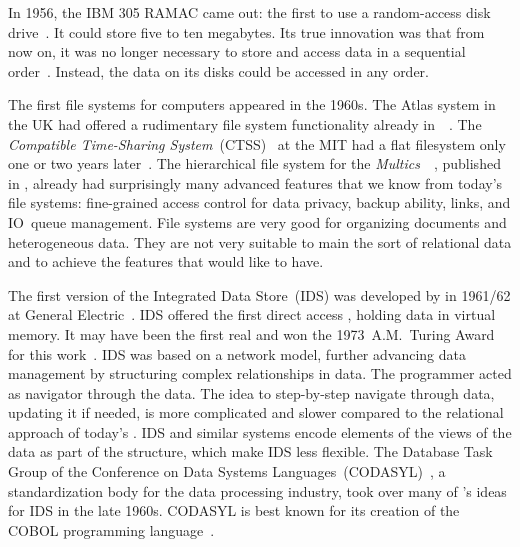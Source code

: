 In 1956, the IBM 305 RAMAC came out: the first to use a random-access disk drive~\cite{IRTFRADDRHBUCASTSFEFSFTE}.
It could store five to ten megabytes.
Its true innovation was that from now on, it was no longer necessary to store and access data in a sequential order~\cite{C20245YOQ}.
Instead, the data on its disks could be accessed in any order.

The first file systems for computers appeared in the 1960s.
The Atlas system in the UK had offered a rudimentary file system functionality already in~\citeyear{KPH1961TAS}~\cite{KPH1961TAS}.
The  \emph{Compatible Time-Sharing System}~(CTSS)~\cite{CMDDCHOK1963TCTSSAPG} at the MIT had a flat filesystem only one or two years later~\cite{OD1963TCCSLABTCDE}.
The hierarchical file system for the \emph{Multics}~~\cite{CV1965IAOOTMS}, published in \citeyear{DN1965AGPFSFSS}, already had surprisingly many advanced features that we know from today's file systems: fine-grained access control for data privacy, backup ability, links, and IO~queue management.
File systems are very good for organizing documents and heterogeneous data.
They are not very suitable to main the sort of relational data and to achieve the features that would like  to have.

The first version of the Integrated Data Store~(IDS) was developed by \citeauthor{B2009TOOTIDSITFDAD} in 1961/62 at General Electric~\cite{B2009TOOTIDSITFDAD,B1965SFRAP}.
IDS offered the first direct access , holding data in virtual memory.
It may have been the first real  and \citeauthor{B2009TOOTIDSITFDAD} won the 1973~A.M.~Turing Award for this work~\cite{H2016HCBITDAFOODW}.
IDS was based on a network model, further advancing data management by structuring complex relationships in data.
The programmer acted as navigator through the data.
The idea to step-by-step navigate through data, updating it if needed, is more complicated and slower compared to the relational approach of today's .
IDS and similar systems encode elements of the views of the data as part of the  structure, which make IDS less flexible.
The Database Task Group of the Conference on Data Systems Languages~(CODASYL)~\cite{TF1976CDBMS}, a standardization body for the data processing industry, took over many of \citeauthor{B2009TOOTIDSITFDAD}'s ideas for IDS in the late 1960s.
CODASYL is best known for its creation of the COBOL programming language~\cite{H2016HCBITDAFOODW}.

